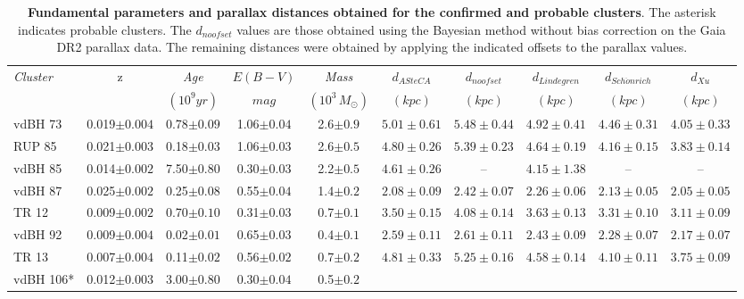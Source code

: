 \documentclass[draft]{aa}
\begin{document}
\begin{table}[ht]
\small
\centering
\caption{\textbf{Fundamental parameters and parallax distances obtained for
the confirmed and probable clusters}. The asterisk indicates probable clusters.
The $d_{noofset}$ values are those obtained using the Bayesian method without
bias correction  on the Gaia DR2 parallax data. The remaining distances were
obtained by applying the indicated offsets to the parallax values.}
\begin{tabular}{lccccccccc}
\hline \hline 
 \emph{Cluster} & z & \emph{Age} & $E(B-V)$ & \emph{Mass} &
 $d_{ASteCA}$ & $d_{noofset}$ & $d_{Lindegren}$ & $d_{Sch\ddot{o}nrich}$ &
 $d_{Xu}$ \\
& & $(10^9 yr)$ & $mag$ & $(10^3\,M_{\odot})$ & $(kpc)$ & $(kpc)$ & $(kpc)$ &
$(kpc)$ & $(kpc)$\\
 \hline
 vdBH 73 & 0.019$\pm0.004$ & 0.78$\pm0.09$ & 1.06$\pm0.04$ & 2.6$\pm0.9$ &
  $5.01\pm0.61$ & $5.48\pm0.44$ & $4.92\pm0.41$ & $4.46\pm0.31$ & $4.05\pm0.33$\\
 RUP 85 & 0.021$\pm0.003$ & 0.18$\pm0.03$ & 1.06$\pm0.03$ & 2.6$\pm0.5$ &
 $4.80\pm0.26$ & $5.39\pm0.23$ & $4.64\pm0.19$ & $4.16\pm0.15$ & $3.83\pm0.14$\\
 vdBH 85 & 0.014$\pm0.002$ & 7.50$\pm0.80$ & 0.30$\pm0.03$ & 2.2$\pm0.5$ &
  $4.61\pm0.26$ & -- & $4.15\pm1.38$ & -- & --\\
 vdBH 87 & 0.025$\pm0.002$ & 0.25$\pm0.08$ & 0.55$\pm0.04$ & 1.4$\pm0.2$ &
 $2.08\pm0.09$ & $2.42\pm0.07$ & $2.26\pm0.06$ & $2.13\pm0.05$ & $2.05\pm0.05$\\
%
 TR 12 & 0.009$\pm0.002$ & 0.70$\pm0.10$ & 0.31$\pm0.03$ & 0.7$\pm0.1$ &
 $3.50\pm0.15$ & $4.08\pm0.14$ & $3.63\pm0.13$ & $3.31\pm0.10$ & $3.11\pm0.09$\\
 vdBH 92 & 0.009$\pm0.004$ & 0.02$\pm0.01$ & 0.65$\pm0.03$ & 0.4$\pm0.1$ &
 $2.59\pm0.11$ & $2.61\pm0.11$ & $2.43\pm0.09$ & $2.28\pm0.07$ & $2.17\pm0.07$\\
 TR 13 & 0.007$\pm0.004$ & 0.11$\pm0.02$ & 0.56$\pm0.02$ & 0.7$\pm0.2$ &
 $4.81\pm0.33$ & $5.25\pm0.16$ & $4.58\pm0.14$ & $4.10\pm0.11$ & $3.75\pm0.09$\\
 vdBH 106* & 0.012$\pm0.003$ & 3.00$\pm0.80$ & 0.30$\pm0.04$ & 0.5$\pm0.2$ &

\end{tabular}
\end{table}
\end{document}
